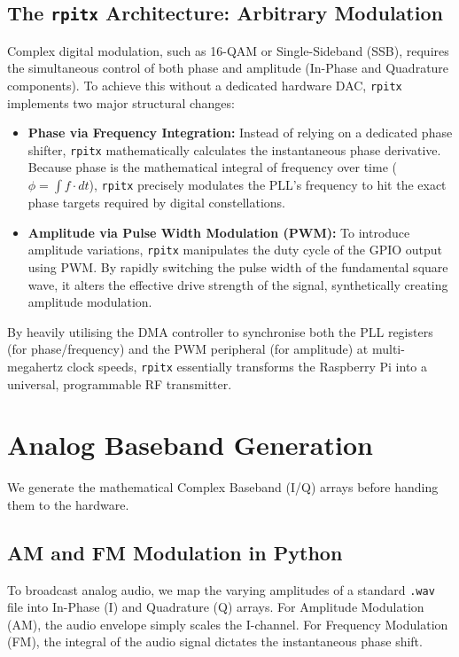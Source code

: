 \documentclass[conference]{IEEEtran}
\begin{document}
\subsection{The \texttt{rpitx} Architecture: Arbitrary Modulation}
Complex digital modulation, such as 16-QAM or Single-Sideband (SSB), requires the simultaneous control of both phase and amplitude (In-Phase and Quadrature components). To achieve this without a dedicated hardware DAC, \texttt{rpitx} implements two major structural changes:

\begin{itemize}
    \item \textbf{Phase via Frequency Integration:} Instead of relying on a dedicated phase shifter, \texttt{rpitx} mathematically calculates the instantaneous phase derivative. Because phase is the mathematical integral of frequency over time ($\phi = \int f \cdot dt$), \texttt{rpitx} precisely modulates the PLL's frequency to hit the exact phase targets required by digital constellations.
    \item \textbf{Amplitude via Pulse Width Modulation (PWM):} To introduce amplitude variations, \texttt{rpitx} manipulates the duty cycle of the GPIO output using PWM. By rapidly switching the pulse width of the fundamental square wave, it alters the effective drive strength of the signal, synthetically creating amplitude modulation.
\end{itemize}

By heavily utilising the DMA controller to synchronise both the PLL registers (for phase/frequency) and the PWM peripheral (for amplitude) at multi-megahertz clock speeds, \texttt{rpitx} essentially transforms the Raspberry Pi into a universal, programmable RF transmitter.
\section{Analog Baseband Generation}
We generate the mathematical Complex Baseband (I/Q) arrays before handing them to the hardware. 

\subsection{AM and FM Modulation in Python}
To broadcast analog audio, we map the varying amplitudes of a standard \texttt{.wav} file into In-Phase (I) and Quadrature (Q) arrays. For Amplitude Modulation (AM), the audio envelope simply scales the I-channel. For Frequency Modulation (FM), the integral of the audio signal dictates the instantaneous phase shift.
\end{document}
